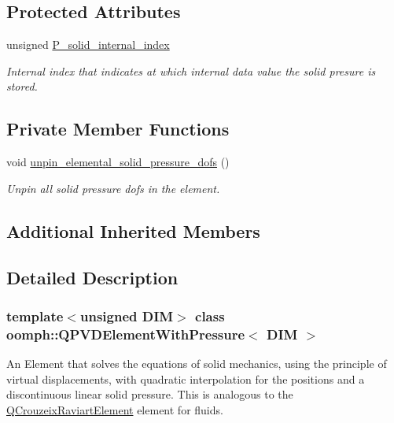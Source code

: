 \subsection*{Protected Attributes}
\begin{DoxyCompactItemize}
\item 
unsigned \hyperlink{classoomph_1_1QPVDElementWithPressure_aee9e009b78d9891746c23bd031b39a1c}{P\+\_\+solid\+\_\+internal\+\_\+index}
\begin{DoxyCompactList}\small\item\em Internal index that indicates at which internal data value the solid presure is stored. \end{DoxyCompactList}\end{DoxyCompactItemize}
\subsection*{Private Member Functions}
\begin{DoxyCompactItemize}
\item 
void \hyperlink{classoomph_1_1QPVDElementWithPressure_adf9446eb7ed36b39e881d03f006290f8}{unpin\+\_\+elemental\+\_\+solid\+\_\+pressure\+\_\+dofs} ()
\begin{DoxyCompactList}\small\item\em Unpin all solid pressure dofs in the element. \end{DoxyCompactList}\end{DoxyCompactItemize}
\subsection*{Additional Inherited Members}


\subsection{Detailed Description}
\subsubsection*{template$<$unsigned D\+IM$>$\newline
class oomph\+::\+Q\+P\+V\+D\+Element\+With\+Pressure$<$ D\+I\+M $>$}

An Element that solves the equations of solid mechanics, using the principle of virtual displacements, with quadratic interpolation for the positions and a discontinuous linear solid pressure. This is analogous to the \hyperlink{classoomph_1_1QCrouzeixRaviartElement}{Q\+Crouzeix\+Raviart\+Element} element for fluids. 

